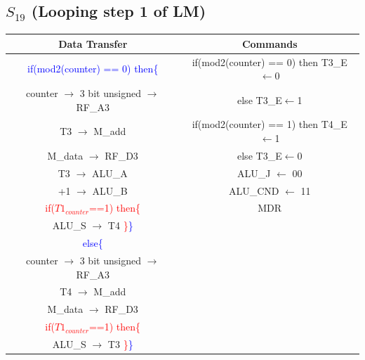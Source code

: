 \documentclass[]{report}
\begin{document}
            \subsection*{$S_{19}$ (Looping step 1 of LM)} %
            \begin{center}
                \begin{tabular}{|c|c|}
                    \hline
                    Data Transfer & Commands \\
                    \hline
                    \textcolor{blue}{if(mod2(counter) == 0) then}\textcolor{blue}{\{} & if(mod2(counter) == 0) then T3\_E$\leftarrow$0 \\
                    counter $\to$ 3 bit unsigned $\to$ RF\_A3 & else T3\_E$\leftarrow$1\\
                    T3 $\to$ M\_add & if(mod2(counter) == 1) then T4\_E$\leftarrow$1\\
                    M\_data $\to$ RF\_D3 & else T3\_E$\leftarrow$0\\
                    T3 $\to$ ALU\_A & ALU\_J $\leftarrow$ 00\\
                    +1 $\to$ ALU\_B & ALU\_CND $\leftarrow$ 11\\
                    \textcolor{red}{if($T1_{counter}$==1) then}\textcolor{red}{\{} & MDR\\
                    ALU\_S $\to$ T4 \textcolor{red}{\}}\textcolor{blue}{\}} & \\ 
                    \textcolor{blue}{else}\textcolor{blue}{\{} & \\
                    counter $\to$ 3 bit unsigned $\to$ RF\_A3 & \\
                    T4 $\to$ M\_add & \\
                    M\_data $\to$ RF\_D3 & \\
                    \textcolor{red}{if($T1_{counter}$==1) then}\textcolor{red}{\{} & \\
                    ALU\_S $\to$ T3 \textcolor{red}{\}}\textcolor{blue}{\}} & \\
                    \hline
                \end{tabular}
            \end{center} 
\end{document}
